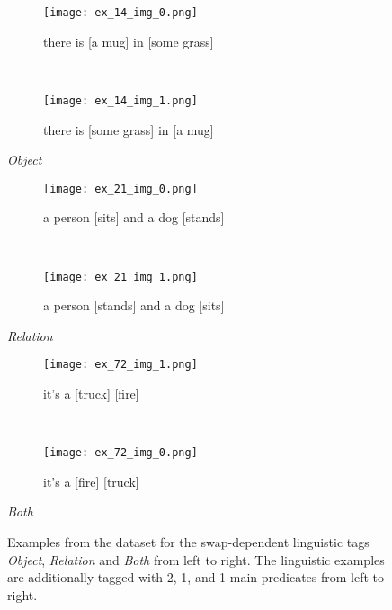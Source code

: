 \begin{figure}
\centering
    \begin{minipage}[t]{.30\textwidth}
        \begin{subfigure}[t]{\textwidth}
        \centering
        \texttt{[image: ex\_14\_img\_0.png]}
        \caption{there is [a mug] in [some grass]}
        \end{subfigure}\\
        \begin{subfigure}[t]{\textwidth}
        \centering
        \texttt{[image: ex\_14\_img\_1.png]}
        \caption{there is [some grass] in [a mug]}
        \end{subfigure}%
        \caption*{\textit{Object}}
    \end{minipage}
    \hfill
    \begin{minipage}[t]{.30\textwidth}
        \begin{subfigure}[t]{\textwidth}
        \centering
        \texttt{[image: ex\_21\_img\_0.png]}
        \caption{a person [sits] and a dog [stands]}
        \end{subfigure}\\
        \begin{subfigure}[t]{\textwidth}
        \centering
        \texttt{[image: ex\_21\_img\_1.png]}
        \caption{a person [stands] and a dog [sits]}
        \end{subfigure}%
        \caption*{\textit{Relation}}
    \end{minipage}
    \hfill
    \begin{minipage}[t]{.30\textwidth}
        \begin{subfigure}[t]{\textwidth}
        \centering
        \texttt{[image: ex\_72\_img\_1.png]}
        \caption{it's a [truck] [fire]}
        \end{subfigure}\\
        \begin{subfigure}[t]{\textwidth}
        \centering
        \texttt{[image: ex\_72\_img\_0.png]}
        \caption{it's a [fire] [truck]}
        \end{subfigure}%
        \caption*{\textit{Both}}
    \end{minipage}%
    \caption{Examples from the dataset for the swap-dependent linguistic tags \textit{Object}, \textit{Relation} and \textit{Both} from left to right. The linguistic examples are additionally tagged with 2, 1, and 1 main predicates from left to right.}
    \label{fig:dataset-examples-linguistic}
\end{figure}

